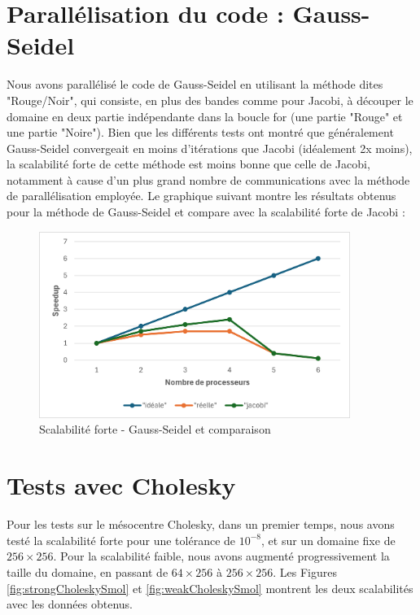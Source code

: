 \documentclass{article}
\begin{document}
\section{Parallélisation du code : Gauss-Seidel}


Nous avons parallélisé le code de Gauss-Seidel en utilisant la méthode dites "Rouge/Noir", qui consiste, en plus des bandes comme pour Jacobi, à découper le domaine en deux partie indépendante dans la boucle for (une partie "Rouge" et une partie "Noire"). Bien que les différents tests ont montré que généralement Gauss-Seidel convergeait en moins d'itérations que Jacobi (idéalement 2x moins), la scalabilité forte de cette méthode est moins bonne que celle de Jacobi, notamment à cause d'un plus grand nombre de communications avec la méthode de parallélisation employée. Le graphique suivant montre les résultats obtenus pour la méthode de Gauss-Seidel et compare avec la scalabilité forte de Jacobi :

\begin{figure}[H]
    \centering
    \includegraphics[width=0.9\textwidth]{strong_scaling_gs.png}
    \caption{Scalabilité forte - Gauss-Seidel et comparaison}
    \label{fig:strongGS}
\end{figure}


\section{Tests avec Cholesky}


Pour les tests sur le mésocentre Cholesky, dans un premier temps, nous avons testé la scalabilité forte pour une tolérance de $10^{-8}$, et sur un domaine fixe de $256\times 256$. Pour la scalabilité faible, nous avons augmenté progressivement la taille du domaine, en passant de $64\times 256$ à $256\times 256$. Les Figures \ref{fig:strongCholeskySmol} et \ref{fig:weakCholeskySmol} montrent les deux scalabilités avec les données obtenus.
\end{document}
